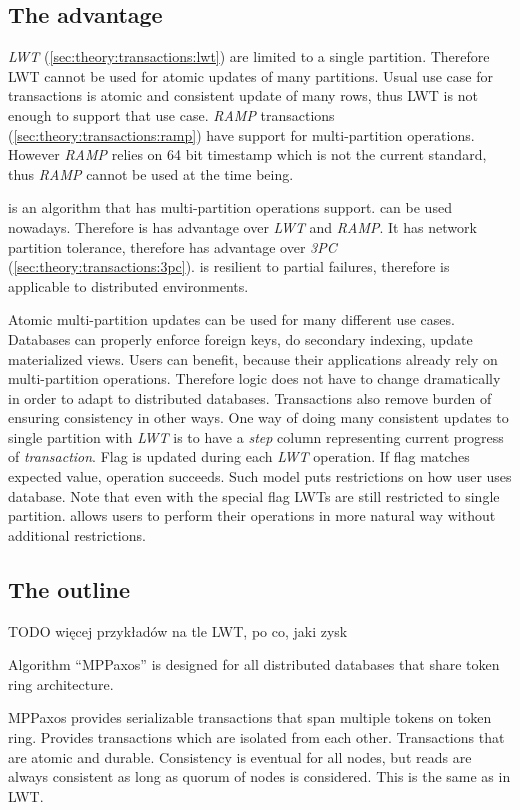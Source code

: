 
\subsection{The advantage}
\emph{LWT} (\ref{sec:theory:transactions:lwt}) are limited to a single partition. Therefore LWT cannot be used for atomic updates of many partitions. Usual use case for transactions is atomic and consistent update of many rows, thus LWT is not enough to support that use case. \emph{RAMP} transactions (\ref{sec:theory:transactions:ramp}) have support for multi-partition operations. 
However \emph{RAMP} relies on 64 bit timestamp which is not the current standard, thus \emph{RAMP} cannot be used at the time being.

\mpp is an algorithm that has multi-partition operations support. \mpp can be used nowadays. Therefore is has advantage over \emph{LWT} and \emph{RAMP}. It has network partition tolerance, therefore has advantage over \emph{3PC} (\ref{sec:theory:transactions:3pc}).
\mpp is resilient to partial failures, therefore is applicable to distributed environments.

Atomic multi-partition updates can be used for many different use cases. Databases can properly enforce foreign keys, do secondary indexing, update materialized views. Users can benefit, because their applications already rely on multi-partition operations. Therefore logic does not have to change dramatically in order to adapt to distributed databases. Transactions also remove burden of ensuring consistency in other ways. One way of doing many consistent updates to single partition with \emph{LWT} is to have a \emph{step} column representing current progress of \emph{transaction}. Flag is updated during each \emph{LWT} operation. If flag matches expected value, operation succeeds. Such model puts restrictions on how user uses database. Note that even with the special flag LWTs are still restricted to single partition. \mpp allows users to perform their operations in more natural way without additional restrictions. 


\subsection{The outline}
TODO więcej przykładów na tle LWT, po co, jaki zysk

Algorithm “MPPaxos” is designed for all distributed databases that share token ring architecture. 

MPPaxos provides serializable transactions that span multiple tokens on token ring. Provides transactions which are isolated from each other. Transactions that are atomic and durable. 
Consistency is eventual for all nodes, but reads are always consistent as long as quorum of nodes is considered. This is the same as in LWT.

